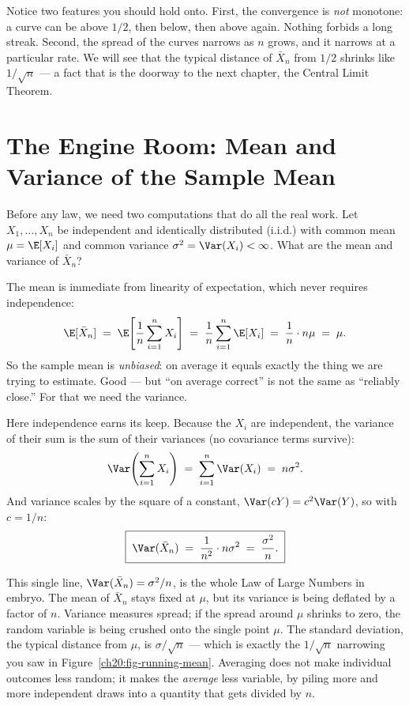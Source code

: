 Notice two features you should hold onto. First, the convergence is \emph{not} monotone: a curve can be above $1/2$, then below, then above again. Nothing forbids a long streak. Second, the spread of the curves narrows as $n$ grows, and it narrows at a particular rate. We will see that the typical distance of $\bar X_n$ from $1/2$ shrinks like $1/\sqrt n$ --- a fact that is the doorway to the next chapter, the Central Limit Theorem.

\section{The Engine Room: Mean and Variance of the Sample Mean}
\label{ch20:engine}

Before any law, we need two computations that do all the real work. Let $X_1, \dots, X_n$ be independent and identically distributed (i.i.d.) with common mean $\mu = \E[X_i]$ and common variance $\sigma^2 = \Var(X_i) < \infty$. What are the mean and variance of $\bar X_n$?

The mean is immediate from linearity of expectation, which never requires independence:
\[
  \E[\bar X_n] \;=\; \E\!\left[\frac1n \sum_{i=1}^n X_i\right] \;=\; \frac1n \sum_{i=1}^n \E[X_i] \;=\; \frac1n \cdot n\mu \;=\; \mu.
\]
So the sample mean is \emph{unbiased}: on average it equals exactly the thing we are trying to estimate. Good --- but ``on average correct'' is not the same as ``reliably close.'' For that we need the variance.

Here independence earns its keep. Because the $X_i$ are independent, the variance of their sum is the sum of their variances (no covariance terms survive):
\[
  \Var\!\left(\sum_{i=1}^n X_i\right) \;=\; \sum_{i=1}^n \Var(X_i) \;=\; n\sigma^2.
\]
And variance scales by the square of a constant, $\Var(cY) = c^2 \Var(Y)$, so with $c = 1/n$:
\[
  \boxed{\;\Var(\bar X_n) \;=\; \frac{1}{n^2}\cdot n\sigma^2 \;=\; \frac{\sigma^2}{n}.\;}
\]

\begin{happeningbox}
This single line, $\Var(\bar X_n) = \sigma^2/n$, is the whole Law of Large Numbers in embryo. The mean of $\bar X_n$ stays fixed at $\mu$, but its variance is being deflated by a factor of $n$. Variance measures spread; if the spread around $\mu$ shrinks to zero, the random variable is being crushed onto the single point $\mu$. The standard deviation, the typical distance from $\mu$, is $\sigma/\sqrt n$ --- which is exactly the $1/\sqrt n$ narrowing you saw in Figure~\ref{ch20:fig-running-mean}. Averaging does not make individual outcomes less random; it makes the \emph{average} less variable, by piling more and more independent draws into a quantity that gets divided by $n$.
\end{happeningbox}

